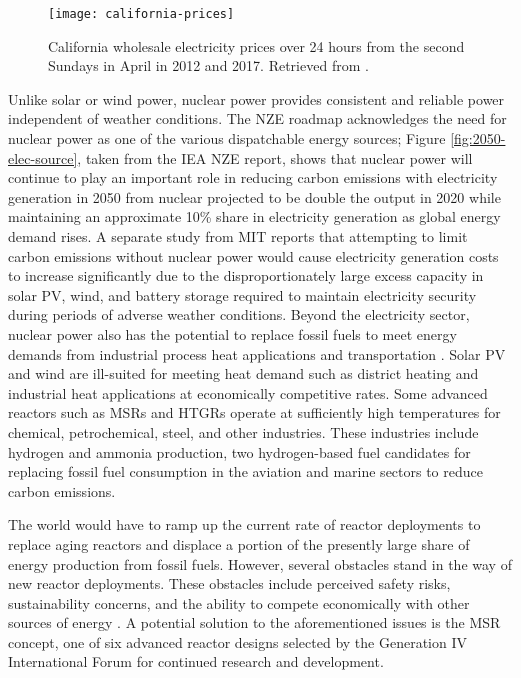 \begin{figure}[htb!]
	\centering
	\texttt{[image: california-prices]}
	\caption{California wholesale electricity prices over 24 hours from the
	second Sundays in April in 2012 and 2017. Retrieved from
	\cite{forsberg_market_2020}.}
	\label{fig:cali-prices}
\end{figure}

Unlike solar or wind power, nuclear power provides consistent and reliable
power independent of weather conditions. The \gls{NZE} roadmap acknowledges the
need for nuclear power as one of the various dispatchable energy sources;
Figure \ref{fig:2050-elec-source}, taken from the \gls{IEA} \gls{NZE} report,
shows that nuclear power will continue to play an important role in reducing
carbon emissions with electricity generation in 2050 from nuclear projected to
be double the output in 2020 while maintaining an approximate 10\% share in
electricity generation as global energy demand rises. A separate study from
\gls{MIT} \cite{petti_future_2018} reports that attempting to limit carbon
emissions without nuclear power would cause electricity generation costs to
increase significantly due to the disproportionately large excess capacity in
solar \gls{PV}, wind, and battery storage required to maintain electricity
security during periods of adverse weather conditions.
Beyond the electricity sector, nuclear power also has the potential to replace
fossil fuels to meet energy demands from industrial process heat applications
and transportation \cite{forsberg_market_2020}. Solar \gls{PV} and
wind are ill-suited for meeting heat demand such as district heating and
industrial heat applications at economically competitive rates. Some advanced
reactors such as \glspl{MSR} and \glspl{HTGR} operate at sufficiently
high temperatures for chemical, petrochemical, steel, and other industries.
These industries include hydrogen and ammonia production, two hydrogen-based
fuel candidates for replacing fossil fuel consumption in the aviation and
marine sectors to reduce carbon emissions.

The world would have to ramp up the current rate of reactor deployments to
replace aging reactors and displace a portion of the presently large share of
energy production from fossil fuels. However, several obstacles stand in the
way of new reactor deployments. These obstacles include perceived
safety risks, sustainability concerns,
and the ability to compete economically with other sources of energy
\cite{massachusetts_institute_of_technology_future_2003}. A potential solution
to the aforementioned issues is the \gls{MSR} concept, one of six advanced
reactor designs selected by the Generation IV International Forum
\cite{gif_technology_2002} for continued research and development.


